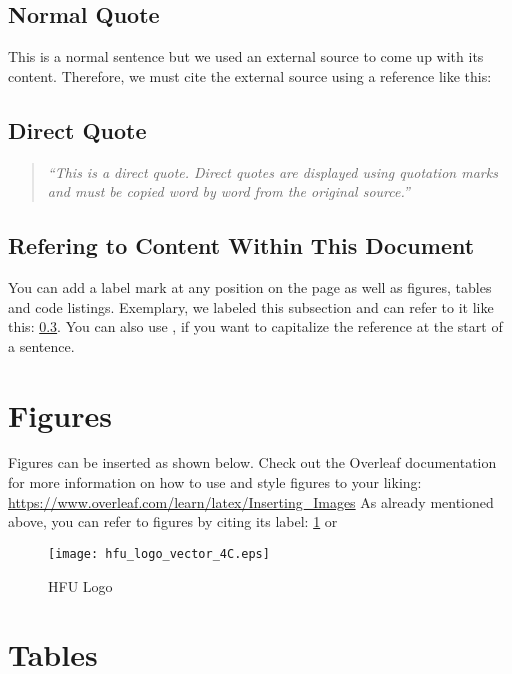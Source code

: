 \subsection{Normal Quote}
This is a normal sentence but we used an external source to come up with its content. Therefore, we must cite the external source using a reference like this: \cite{example}

\subsection{Direct Quote}
\begin{quote}
    \textit{\enquote{This is a direct quote. Direct quotes are displayed using quotation marks and must be copied word by word from the original source.}} \cite{example}
\end{quote}

\subsection{Refering to Content Within This Document}
\label{example_label}
You can add a label mark at any position on the page as well as figures, tables and code listings. Exemplary, we labeled this subsection and can refer to it like this:  \cref{example_label}. You can also use , if you want to capitalize the reference at the start of a sentence.


\section{Figures}

Figures can be inserted as shown below. Check out the Overleaf documentation for more information on how to use and style figures to your liking: \url{https://www.overleaf.com/learn/latex/Inserting_Images} As already mentioned above, you can refer to figures by citing its label: \cref{pic:hfu_logo} or 
\begin{figure}[ht]  %
    \centering      %
    \texttt{[image: hfu\_logo\_vector\_4C.eps]}
    \caption{HFU Logo}      %
    \label{pic:hfu_logo}    %
\end{figure}


\section{Tables}

